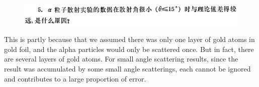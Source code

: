 \documentclass{article}
\begin{document}
\begin{figure}[H]
  \centering
  \includegraphics[width=\linewidth]{figures/Problem5}
  \label{fig:}
\end{figure}

This is partly because that we assumed there was only one layer of gold atoms in gold foil, and the alpha particles would only be scattered once. But in fact, there are several layers of gold atoms. For small angle scattering results, since the result was accumulated by some small angle scatterings, each cannot be ignored and contributes to a large proportion of error.
\end{document}

